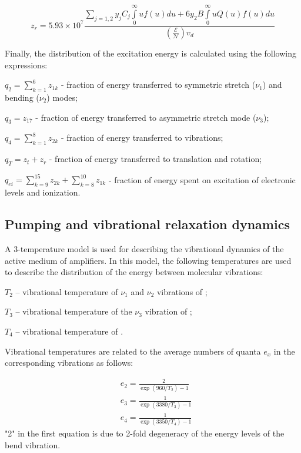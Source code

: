\documentclass{report}
\begin{document}
\begin{equation}\label{eq:z_r}
z_r = 5.93 \times 10^7 \frac{\sum\limits_{j=1,2} y_j C_j \int\limits_0^\infty uf(u)du + 6 y_2 B \int\limits_0^\infty u Q(u) f(u) du} {\left( \frac{\mathcal{E}}{\mathcal{N}} \right) v_d} 
\end{equation}

Finally, the distribution of the excitation energy is calculated using the following expressions:

$q_2 = \sum\limits_{k=1}^6 z_{1k}$ - fraction of energy transferred to  symmetric stretch ($\nu_1$) and bending ($\nu_2$) modes;

$q_3 = z_{17}$ - fraction of energy transferred to  asymmetric stretch mode ($\nu_3$);

$q_4 = \sum\limits_{k=1}^8 z_{2k}$ - fraction of energy transferred to  vibrations;

$q_T = z_t + z_r$ - fraction of energy transferred to translation and rotation;

$q_{ei} = \sum\limits_{k=9}^{15} z_{2k}  + \sum\limits_{k=8}^{10} z_{1k}$ - fraction of energy spent on excitation of electronic levels and ionization.



\subsection{Pumping and vibrational relaxation dynamics}
A 3-temperature model is used for describing the vibrational dynamics of the active medium of  amplifiers. In this model, the following temperatures are used to describe the distribution of the energy between molecular vibrations:

$T_2$ – vibrational temperature of $\nu_1$ and $\nu_2$ vibrations of ;

$T_3$ – vibrational temperature of the $\nu_3$ vibration of ;

$T_4$ – vibrational temperature of .

Vibrational temperatures are related to the average numbers of quanta $e_x$ in the corresponding vibrations as follows:

\begin{equation}\label{eq:e}
\begin{aligned}
&{e_2} = \frac{2}{\exp(960/{T_2})-1}\\
&{e_3} = \frac{1}{\exp(3380/{T_3})-1}\\
&{e_4} = \frac{1}{\exp(3350/{T_4})-1} 
\end{aligned}
\end{equation}
"2" in the first equation is due to 2-fold degeneracy of the energy levels of the bend vibration.
\end{document}
